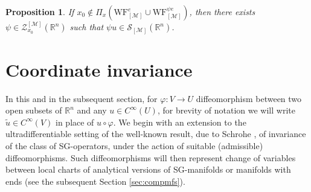 \documentclass[11pt,reqno]{amsart}
\numberwithin{equation}{section}
\newtheorem{proposition}[theorem]{Proposition}
\newcommand{\R}{{\mathbb{R}}} %
\newcommand{\caS}{{\mathcal{S}}}
\newcommand{\ZZ}{{\mathcal{Z}}}
\newcommand{\M}{{\mathcal{M}}} %
\begin{document}
\begin{proposition}
	If $x_0\notin \Pi_x\left(\mathrm{WF}_{[\M]}^{e}\cup \mathrm{WF}_{[\M]}^{\psi e} \right)$, then there exists $\psi\in\ZZ_{x_0}^{[\M]}(\R^n)$ 
	such that $\psi u\in\caS_{[\M]}(\R^n)$.
\end{proposition}




\section{Coordinate invariance}\label{sec_coord_inv}


In this and in the subsequent section, for $\varphi:V\to U$ diffeomorphism between two open subsets of $\mathbb{R}^n$ and any $u\in C^\infty(U)$, for brevity of notation we will write $\tilde u\in C^\infty(V)$ in place of $u\circ\varphi$. We begin with an extension to the ultradifferentiable setting of the well-known result, due to Schrohe \cite{Schrohe86}, of invariance of the class of SG-operators, under the action of suitable (admissible) diffeomorphisms. Such diffeomorphisms will then represent
change of variables between local charts of analytical versions of SG-manifolds or manifolds with ends (see the subsequent Section \ref{sec:compmfs}).
\end{document}
